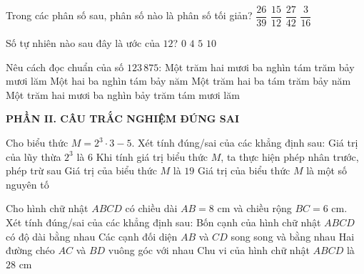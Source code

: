 \documentclass[12pt,a4paper]{article}
\begin{document}
\begin{ex}
Trong các phân số sau, phân số nào là phân số tối giản?
\choice
{$\dfrac{26}{39}$}
{$\dfrac{15}{12}$}
{$\dfrac{27}{42}$}
{\True $\dfrac{3}{16}$}
\end{ex}

\begin{ex}
Số tự nhiên nào sau đây là ước của $12$?
\choice
{$0$}
{\True $4$}
{$5$}
{$10$}
\end{ex}

\begin{ex}
Nêu cách đọc chuẩn của số $123\,875$:
\choice
{\True Một trăm hai mươi ba nghìn tám trăm bảy mươi lăm}
{Một hai ba nghìn tám bảy năm}
{Một trăm hai ba tám trăm bảy năm}
{Một trăm hai mươi ba nghìn bảy trăm tám mươi lăm}
\end{ex}


\setcounter{ex}{0}
\vspace{2mm}
\noindent\textbf{\large PHẦN II. CÂU TRẮC NGHIỆM ĐÚNG SAI}
\vspace{1mm}
\begin{ex}
Cho biểu thức $M = 2^3 \cdot 3 - 5$. Xét tính đúng/sai của các khẳng định sau:
\choiceTF
{Giá trị của lũy thừa $2^3$ là $6$}
{Khi tính giá trị biểu thức $M$, ta thực hiện phép nhân trước, phép trừ sau}
{\True Giá trị của biểu thức $M$ là $19$}
{\True Giá trị của biểu thức $M$ là một số nguyên tố}
\end{ex}

\begin{ex}
Cho hình chữ nhật $ABCD$ có chiều dài $AB = 8\text{ cm}$ và chiều rộng $BC = 6\text{ cm}$. Xét tính đúng/sai của các khẳng định sau:
\choiceTF
{Bốn cạnh của hình chữ nhật $ABCD$ có độ dài bằng nhau}
{\True Các cạnh đối diện $AB$ và $CD$ song song và bằng nhau}
{Hai đường chéo $AC$ và $BD$ vuông góc với nhau}
{\True Chu vi của hình chữ nhật $ABCD$ là $28\text{ cm}$}
\end{ex}
\end{document}
